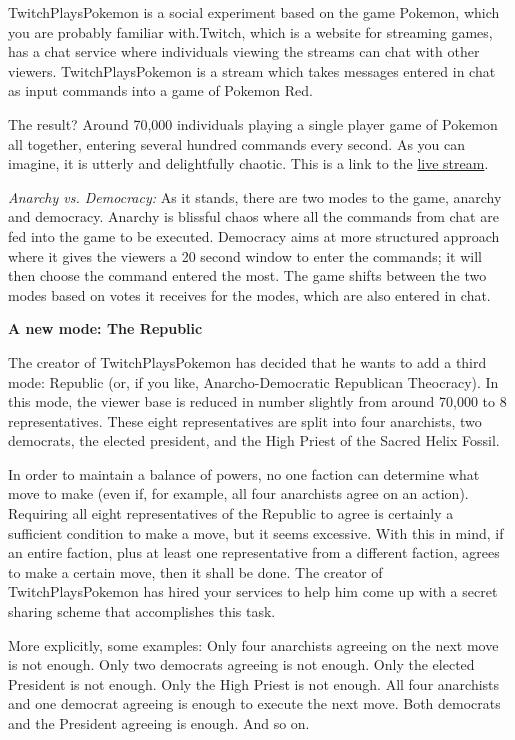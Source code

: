 \documentclass[]{article}
\begin{document}
\begin{qunlist}
TwitchPlaysPokemon is a social experiment based on the game Pokemon, which you are probably familiar with.Twitch, which is a website for streaming games, has a chat service where individuals viewing the streams can chat with other viewers. TwitchPlaysPokemon is a stream which takes messages entered in chat as input commands into a game of Pokemon Red.

The result? Around 70,000 individuals playing a single player game of Pokemon all together, entering several hundred commands every second. As you can imagine, it is utterly and delightfully chaotic. This is a link to the \href{http://www.twitch.tv/twitchplayspokemon}{live stream}.

\textit{Anarchy vs. Democracy:}
As it stands, there are two modes to the game, anarchy and democracy. Anarchy is blissful chaos where all the commands from chat are fed into the game to be executed. Democracy aims at more structured approach where it gives the viewers a 20 second window to enter the commands; it will then choose the command entered the most. The game shifts between the two modes based on votes it receives for the modes, which are also entered in chat.

\textbf{A new mode: The Republic}

The creator of TwitchPlaysPokemon has decided that he wants to add a third mode: Republic (or, if you like, Anarcho-Democratic Republican Theocracy). 
In this mode, the viewer base is reduced in number slightly from around 70,000 to $8$ representatives. 
These eight representatives are split into four anarchists, two democrats, the elected president, and the High Priest of the Sacred Helix Fossil. 

In order to maintain a balance of powers, no one faction can determine what move to make (even if, for example, all four anarchists agree on an action). Requiring all eight representatives of the Republic to agree is certainly a sufficient condition to make a move, but it seems excessive. With this in mind, if an entire faction, plus at least one representative from a different faction, agrees to make a certain move, then it shall be done.
The creator of TwitchPlaysPokemon has hired your services to help him come up with a secret sharing scheme that accomplishes this task.

More explicitly, some examples: 
Only four anarchists agreeing on the next move is not enough. 
Only two democrats agreeing is not enough. 
Only the elected President is not enough. 
Only the High Priest is not enough. 
All four anarchists and one democrat agreeing is enough to execute the next move.
Both democrats and the President agreeing is enough.
And so on.


\end{qunlist}
\end{document}
